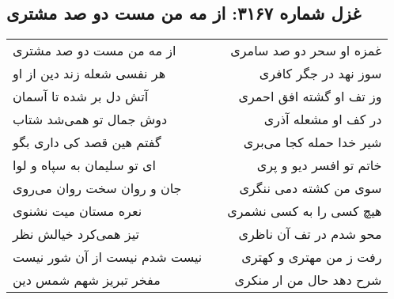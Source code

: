 \begin{center}
\section*{غزل شماره ۳۱۶۷: از مه من مست دو صد مشتری}
\label{sec:3167}
\begin{longtable}{l p{0.5cm} r}
از مه من مست دو صد مشتری
&&
غمزه او سحر دو صد سامری
\\
هر نفسی شعله زند دین از او
&&
سوز نهد در جگر کافری
\\
آتش دل بر شده تا آسمان
&&
وز تف او گشته افق احمری
\\
دوش جمال تو همی‌شد شتاب
&&
در کف او مشعله آذری
\\
گفتم هین قصد کی داری بگو
&&
شیر خدا حمله کجا می‌بری
\\
ای تو سلیمان به سپاه و لوا
&&
خاتم تو افسر دیو و پری
\\
جان و روان سخت روان می‌روی
&&
سوی من کشته دمی ننگری
\\
نعره مستان میت نشنوی
&&
هیچ کسی را به کسی نشمری
\\
تیز همی‌کرد خیالش نظر
&&
محو شدم در تف آن ناظری
\\
نیست شدم نیست از آن شور نیست
&&
رفت ز من مهتری و کهتری
\\
مفخر تبریز شهم شمس دین
&&
شرح دهد حال من ار منکری
\\
\end{longtable}
\end{center}
